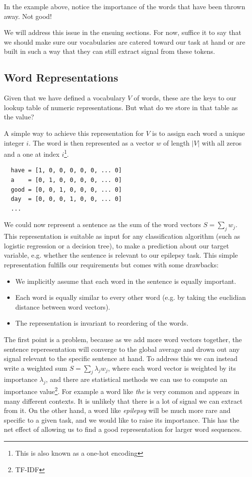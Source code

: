 
In the example above, notice the importance of the words that have been thrown away. Not good!

We will address this issue in the ensuing sections. For now, suffice it to say that we should make sure our vocabularies are catered toward our task at hand or are built in such a way that they can still extract signal from these tokens.

\subsection{Word Representations}

Given that we have defined a vocabulary $V$ of words, these are the keys to our lookup table of numeric representations. But what do we store in that table as the value?

A simple way to achieve this representation for $V$ is to assign each word a unique integer $i$.
The word is then represented as a vector $w$ of length $|V|$ with all zeros and a one at index $i$\footnote{This is also known as a one-hot encoding}.

\begin{verbatim}
  have = [1, 0, 0, 0, 0, 0, ... 0]
  a    = [0, 1, 0, 0, 0, 0, ... 0]
  good = [0, 0, 1, 0, 0, 0, ... 0]
  day  = [0, 0, 0, 1, 0, 0, ... 0]
  ...
\end{verbatim}

We could now represent a sentence as the sum of the word vectors $S = \sum_j w_j$. This representation is suitable as input for any classification algorithm (such as logistic regression or a decision tree), to make a prediction about our target variable, e.g. whether the sentence is relevant to our epilepsy task.
This simple representation fulfills our requirements but comes with some drawbacks:
\begin{itemize}
    \item We implicitly assume that each word in the sentence is equally important.
    \item Each word is equally similar to every other word (e.g. by taking the euclidian distance between word vectors).
    \item The representation is invariant to reordering of the words.
\end{itemize}
The first point is a problem, because as we add more word vectors together, the sentence reperesentation will converge to the global average and drown out any signal relevant to the specific sentence at hand.
To address this we can instead write a weighted sum $S = \sum_j \lambda_j w_j$, where each word vector is weighted by its importance $\lambda_j$, and there are statistical methods we can use to compute an importance value\footnote{TF-IDF}.
For example a word like \textit{the} is very common and appears in many different contexts.
It is unlikely that there is a lot of signal we can extract from it.
On the other hand, a word like \textit{epilepsy} will be much more rare and specific to a given task, and we would like to raise its importance.
This has the net effect of allowing us to find a good representation for larger word sequences.


